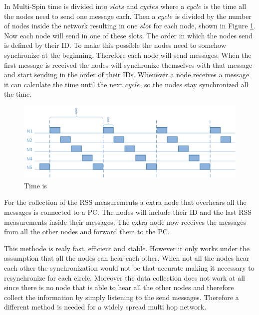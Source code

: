 In Multi-Spin time is divided into $slots$ and $cycles$ where a $cycle$ is the time all the nodes need to send one message each. Then a $cycle$ is divided by the number of nodes inside the network resulting in one $slot$ for each node, shown in Figure \ref{fig:multi}. Now each node will send in one of these slots. The order in which the nodes send is defined by their ID. To make this possible the nodes need to somehow synchronize at the beginning. Therefore each node will send messages. When the first message is received the nodes will synchronize themselves with that message and start sending in the order of their IDs. Whenever a node receives a message it can calculate the time until the next $cycle$, so the nodes stay synchronized all the time.  \cite{RtiMulti}

\begin{figure}[htbp]
	\centering
    \includegraphics[scale=0.8]{content/images/Multispin}
   	\caption{Time is  \cite{RtiMulti}}
    \label{fig:multi}
\end{figure}

For the collection of the RSS measurements a extra node that overhears all the messages is connected to a PC. The nodes will include their ID and the last RSS measurements inside their messages. The extra node now receives the messages from all the other nodes and forward them to the PC.  \cite{RtiMulti}

This methode is realy fast, efficient and stable. However it only works under the assumption that all the nodes can hear each other. When not all the nodes hear each other the synchronization would not be that accurate making it necessary to resynchronize for each circle. Moreover the data collection does not work at all since there is no node that is able to hear all the other nodes and therefore collect the information by simply listening to the send messages.
Therefore a different method is needed for a widely spread multi hop network.

 
